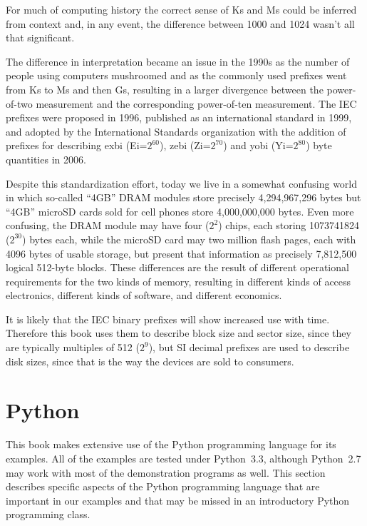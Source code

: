 For much of computing history the correct sense of Ks and Ms could be
inferred from context and, in any event, the difference between 1000
and 1024 wasn't all that significant.

The difference in interpretation became an issue in the 1990s as the
number of people using computers mushroomed and as the commonly used
prefixes went from Ks to Ms and then Gs, resulting in a larger
divergence between the power-of-two measurement and the corresponding
power-of-ten measurement. The IEC prefixes were proposed in
1996\cite{iec:1996},
published as an international standard in 1999, and adopted by the
International Standards organization with the addition of prefixes for
describing exbi (Ei=$2^{60}$), zebi (Zi=$2^{70}$) and yobi (Yi=$2^{80}$) byte
quantities in 2006\cite{iec:80000-13:2008}.  

Despite this standardization effort, today we live in a somewhat
confusing world in which so-called ``4GB'' DRAM modules 
store precisely 4,294,967,296 bytes
but ``4GB'' microSD cards sold for cell
phones store 4,000,000,000 bytes. Even more confusing, the DRAM
module may have four ($2^{2}$) chips, each storing 1073741824
($2^{30}$) bytes each, while the microSD card may two million flash
pages, each with 4096 bytes of usable storage, but present that
information as precisely 7,812,500 logical 512-byte blocks.  These
differences are the result of different operational requirements for
the two kinds of memory, resulting in different kinds of access
electronics, different kinds of software, and different economics. 

It is likely that the IEC binary prefixes will show increased use
with time. Therefore this book uses them to describe block size and
sector size, since they are typically multiples of 512 ($2^9$), but 
SI decimal prefixes are used to describe disk sizes, since that is the way
the devices are sold to consumers.



\section{Python}
This book makes extensive use of the Python programming language for
its examples. All of the examples are tested under Python~3.3,
although Python~2.7 may work with most of the demonstration programs
as well.  This section describes specific aspects of the Python
programming language that are important in our examples and that may
be missed in an introductory Python programming class.


